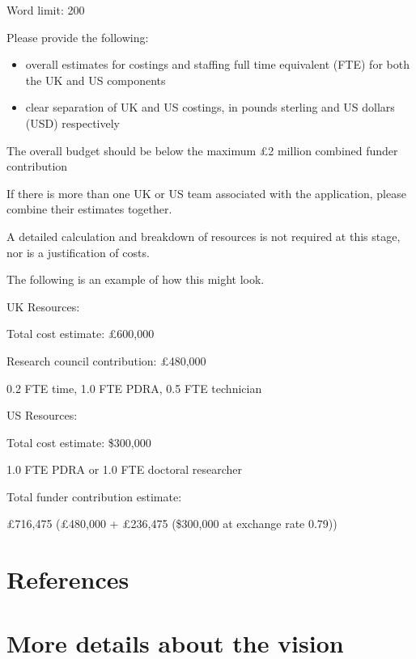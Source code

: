 \documentclass[12in]{article}
\newcommand{\referencessection}{\section*{References}}
\begin{document}
{\color{red}

Word limit: 200

Please provide the following:

\begin{itemize}

	\item overall estimates for costings and staffing full time equivalent (FTE) for both
the UK and US components

	\item clear separation of UK and US costings, in pounds sterling and US dollars
(USD) respectively

\end{itemize}

The overall budget should be below the maximum £2 million combined funder
contribution

If there is more than one UK or US team associated with the application, please
combine their estimates together.

A detailed calculation and breakdown of resources is not required at this stage,
nor is a justification of costs.

The following is an example of how this might look.

UK Resources:

Total cost estimate: £600,000

Research council contribution: £480,000

0.2 FTE time, 1.0 FTE PDRA, 0.5 FTE technician

US Resources:

Total cost estimate: \$300,000

1.0 FTE PDRA or 1.0 FTE doctoral researcher

Total funder contribution estimate:

£716,475 (£480,000 + £236,475 (\$300,000 at exchange rate 0.79))

}

\referencessection
{}




\appendix

\section{More details about the vision}


\end{document}
